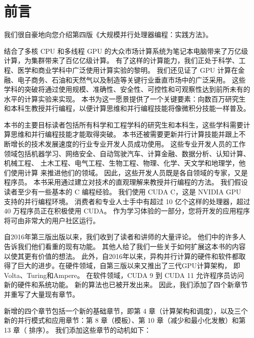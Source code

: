 \section*{前言}
我们很自豪地向您介绍第四版《大规模并行处理器编程：实践方法》。

结合了多核 CPU 和多线程 GPU 的大众市场计算系统为笔记本电脑带来了万亿级计算，为集群带来了百亿亿级计算。 
有了这样的计算能力，我们正处于科学、工程、医学和商业学科中广泛使用计算实验的黎明。 
我们还见证了 GPU 计算在金融、电子商务、石油和天然气以及制造等关键行业垂直市场中的广泛采用。 
这些学科的突破将通过使用规模、准确性、安全性、可控性和可观察性达到前所未有的水平的计算实验来实现。 
本书为这一愿景提供了一个关键要素：向数百万研究生和本科生教授并行编程，以便计算思维和并行编程技能将像微积分技能一样普及。

本书的主要目标读者包括所有科学和工程学科的研究生和本科生，这些学科需要计算思维和并行编程技能才能取得突破。 
本书还被需要更新并行计算技能并跟上不断增长的技术发展速度的行业专业开发人员成功使用。 
这些专业开发人员的工作领域包括机器学习、网络安全、自动驾驶汽车、计算金融、数据分析、认知计算、机械工程、
土木工程、电气工程、生物工程、物理、化学、天文学和地理学，他们使用计算 来推进他们的领域。 
因此，这些开发人员既是各自领域的专家，又是程序员。 本书采用通过建立对技术的直观理解来教授并行编程的方法。 
我们假设读者至少有一些基本的 C 编程经验。 我们使用 CUDA C，这是 NVIDIA GPU 支持的并行编程环境。 
消费者和专业人士手中有超过 10 亿个这样的处理器，超过 40 万程序员正在积极使用 CUDA。 
作为学习体验的一部分，您将开发的应用程序将可由非常大的用户社区运行。

自2016年第三版出版以来，我们收到了读者和讲师的大量评论。 他们中的许多人告诉我们他们看重的现有功能。 
其他人给了我们一些关于如何扩展这本书的内容以使其更有价值的想法。 
此外，自2016年以来，异构并行计算的硬件和软件都取得了巨大的进步。在硬件领域，自第三版以来又推出了三代GPU计算架构，
即Volta、Turing和Ampere。 在软件领域，CUDA 9 到 CUDA 11 允许程序员访问新的硬件和系统功能。 
新的算法也已被开发出来。 因此，我们添加了四个新章节并重写了大量现有章节。

新增的四个章节包括一个新的基础章节，即第 4 章（计算架构和调度），以及三个新的并行模式和应用章节：第 8 章（模板）、第 10 章（减少和最小化发散）和第 13 章（ 排序）。 我们添加这些章节的动机如下：

